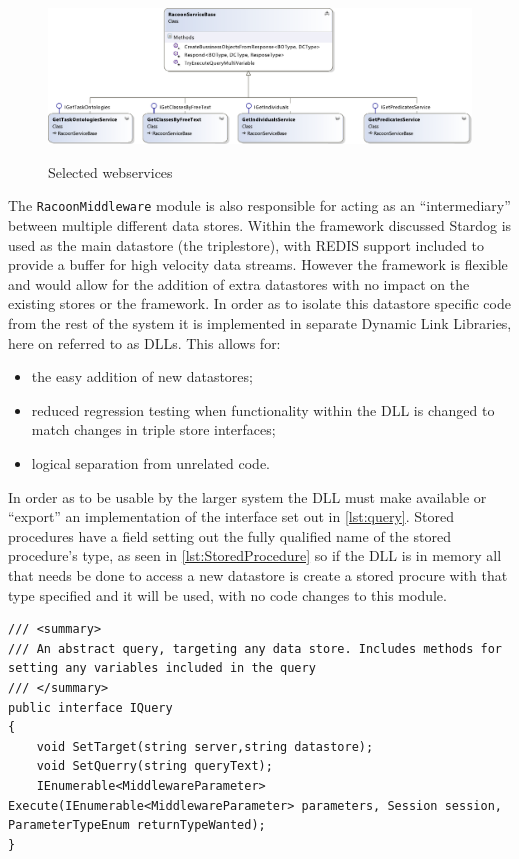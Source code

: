  \begin{figure}
\myfloatalign
{\includegraphics[width=\paperwidth]{gfx/RacoonServices}} 
\caption{Selected webservices}
\label{fig:services}
\end{figure}

The \texttt{RacoonMiddleware} module is also responsible for acting as an \enquote{intermediary} between multiple different data stores. Within the framework discussed Stardog is used as the main datastore (the triplestore), with REDIS support included to provide a buffer for high velocity data streams. However the framework is flexible and would allow for the addition of extra datastores with no impact on the existing stores or the framework. In order as to isolate this datastore specific code from the rest of the system it is implemented in separate Dynamic Link Libraries, here on referred to as DLLs. This allows for:
\begin{itemize}
\item the easy addition of new datastores;
\item reduced regression testing when functionality within the DLL is changed to match changes in triple store interfaces;
\item logical separation from unrelated code. 
\end{itemize}
In order as to be usable by the larger system the DLL must make available or \enquote{export} an implementation of the interface set out in \autoref{lst:query}. Stored procedures have a field setting out the fully qualified name of the stored procedure's type, as seen in \autoref{lst:StoredProcedure} so if the DLL is in memory all that needs be done to access a new datastore is create a stored procure with that type specified and it will be used, with no code changes to this module. 


\vfill
\begin{lstlisting}[language={[Sharp]C},frame=tb,caption={The IQuery interface, which must be implemented by all executable queries},label=lst:query]
/// <summary>
/// An abstract query, targeting any data store. Includes methods for setting any variables included in the query
/// </summary>
public interface IQuery
{
    void SetTarget(string server,string datastore);
    void SetQuerry(string queryText);
    IEnumerable<MiddlewareParameter> Execute(IEnumerable<MiddlewareParameter> parameters, Session session, ParameterTypeEnum returnTypeWanted);      
}
\end{lstlisting}

